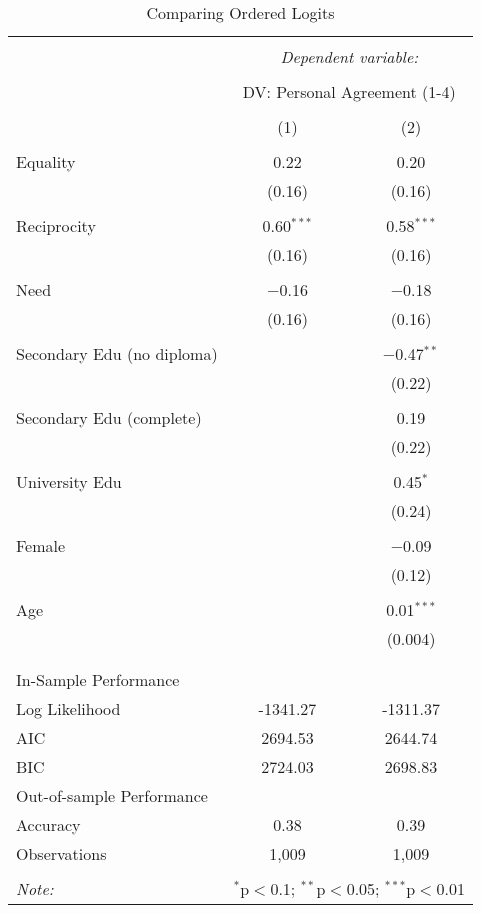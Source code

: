 \documentclass{article}
\begin{document}
\begin{table}[!htbp] \centering 
  \caption{Comparing Ordered Logits} 
  \label{tab:comparison} 
\begin{tabular}{@{\extracolsep{5pt}}lcc} 
\\[-1.8ex]\hline 
\hline \\[-1.8ex] 
 & \multicolumn{2}{c}{\textit{Dependent variable:}} \\ 
\cline{2-3} 
\\[-1.8ex] & \multicolumn{2}{c}{DV: Personal Agreement (1-4)} \\ 
\\[-1.8ex] & (1) & (2)\\ 
\hline \\[-1.8ex] 
 Equality & 0.22 & 0.20 \\ 
  & (0.16) & (0.16) \\ 
  & & \\ 
 Reciprocity & 0.60$^{***}$ & 0.58$^{***}$ \\ 
  & (0.16) & (0.16) \\ 
  & & \\ 
 Need & $-$0.16 & $-$0.18 \\ 
  & (0.16) & (0.16) \\ 
  & & \\ 
 Secondary Edu (no diploma) &  & $-$0.47$^{**}$ \\ 
  &  & (0.22) \\ 
  & & \\ 
 Secondary Edu (complete) &  & 0.19 \\ 
  &  & (0.22) \\ 
  & & \\ 
 University Edu &  & 0.45$^{*}$ \\ 
  &  & (0.24) \\ 
  & & \\ 
 Female &  & $-$0.09 \\ 
  &  & (0.12) \\ 
  & & \\ 
 Age &  & 0.01$^{***}$ \\ 
  &  & (0.004) \\ 
  & & \\ 
\hline \\[-1.8ex] 
In-Sample Performance &  &  \\ 
Log Likelihood & -1341.27 & -1311.37 \\ 
AIC & 2694.53 & 2644.74 \\ 
BIC & 2724.03 & 2698.83 \\ 
Out-of-sample Performance &  &  \\ 
Accuracy & 0.38 & 0.39 \\ 
Observations & 1,009 & 1,009 \\ 
\hline 
\hline \\[-1.8ex] 
\textit{Note:}  & \multicolumn{2}{r}{$^{*}$p$<$0.1; $^{**}$p$<$0.05; $^{***}$p$<$0.01} \\ 
\end{tabular} 
\end{table} 
\end{document}
